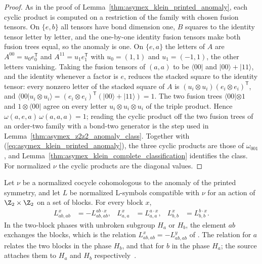 \begin{proof}
    \leanok
    As in the proof of Lemma~\ref{thm:asymex_klein_printed_anomaly},
    each cyclic product is computed on a restriction of the family with
    chosen fusion tensors. On $\{e,b\}$ all tensors have bond dimension one,
    $B$ squares to the identity tensor letter by letter, and the one-by-one
    identity fusion tensors make both fusion trees equal, so the anomaly is
    one. On $\{e,a\}$ the letters of $A$ are $A^{00}=u_0e_0^{\mathsf T}$ and
    $A^{11}=u_1e_1^{\mathsf T}$ with $u_0=(1,1)$ and $u_1=(-1,1)$, the other
    letters vanishing. Taking the fusion tensors of $(a,a)$ to be
    $\langle 00|$ and $|00\rangle+|11\rangle$, and the identity whenever a
    factor is $e$, reduces the stacked square to the identity tensor: every
    nonzero letter of the stacked square of $A$ is
    $(u_i\otimes u_i)(e_i\otimes e_i)^{\mathsf T}$, and
    $\langle 00|u_i\otimes u_i\rangle=(e_i\otimes e_i)^{\mathsf T}(|00\rangle+|11\rangle)=1$.
    The two fusion trees $\langle 00|\otimes 1$ and $1\otimes\langle 00|$
    agree on every letter $u_i\otimes u_i\otimes u_i$ of the triple product.
    Hence $\omega(a,e,a)\,\omega(a,a,a)=1$; reading the cyclic product off
    the two fusion trees of an order-two family with a bond-two generator is
    the step used in Lemma~\ref{thm:asymex_z2z2_anomaly_class}. Together with
    (\ref{eq:asymex_klein_printed_anomaly}), the three cyclic products are
    those of $\omega_{001}$, and
    Lemma~\ref{thm:asymex_klein_complete_classification} identifies the
    class. For normalized $\nu$ the cyclic products are the diagonal values.
\end{proof}

\begin{lemma}
    \label{thm:asymex_klein_printed_l_symbols}
    \leanok
    Let $\nu$ be a normalized cocycle cohomologous to the anomaly of the
    printed symmetry, and let $L$ be normalized L-symbols compatible with
    $\nu$ for an action of $\Z_2\times\Z_2$ on a set of blocks. For every
    block $x$,
    \begin{align}
        \label{eq:asymex_klein_printed_l_signs}
        L^x_{ab,ab} & =-L^{ab\cdot x}_{ab,ab}, &
        L^x_{a,a}   & =L^{a\cdot x}_{a,a},     &
        L^x_{b,b}   & =L^{b\cdot x}_{b,b}.
    \end{align}
    In the two-block phases with unbroken subgroup $H_a$ or $H_b$, the element
    $ab$ exchanges the blocks, which is the relation
    $L^x_{ab,ab}=-L^y_{ab,ab}$ of \cite[Section~6]{GarreRubio2023MPOSym}. The
    relation for $a$ relates the two blocks in the phase $H_b$, and that for
    $b$ in the phase $H_a$; the source attaches them to $H_a$ and $H_b$
    respectively~\cite{gap:glm23_klein_printed_anomaly_scope}.
\end{lemma}

